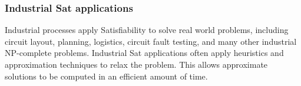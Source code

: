 \subsubsection{Industrial {\sc Sat} applications}

Industrial processes apply {\sc Satisfiability} to solve real world problems, including circuit layout, planning, logistics, circuit fault testing, and many other industrial \textsf{NP-complete} problems.  Industrial {\sc Sat} applications often apply heuristics and approximation techniques to relax the problem.  This allows approximate solutions to be computed in an efficient amount of time.
